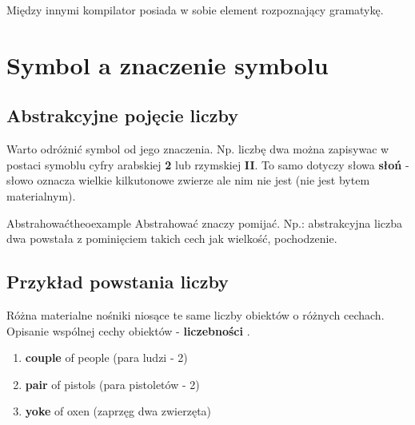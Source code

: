 	Między innymi kompilator posiada w sobie element rozpoznający gramatykę. \newline

\newpage
\section{Symbol a znaczenie symbolu}

	\subsection{Abstrakcyjne pojęcie liczby}
		
		Warto odróżnić symbol od jego znaczenia. Np. liczbę dwa można zapisywac w postaci symoblu 
		cyfry arabskiej { \bf 2} lub rzymskiej  { \bf II}. To samo dotyczy słowa 
		{ \bf słoń } - słowo oznacza wielkie kilkutonowe zwierze ale nim nie jest 
		(nie jest bytem materialnym). \newline

		 \begin{mytheo}{Abstrahować}{theoexample}
		 	Abstrahować znaczy pomijać. \newline
			Np.: abstrakcyjna liczba dwa powstała z pominięciem takich 
			cech jak wielkość, pochodzenie.
		\end{mytheo}

		 
	\subsection{Przykład powstania liczby}
		Różna materialne nośniki niosące te same liczby obiektów o różnych cechach. \newline
		Opisanie wspólnej cechy obiektów - { \bf liczebności} .
		
		\begin{enumerate}[label=(\roman*)]
		  \item {\bf couple} of people (para ludzi - 2)
		  \item {\bf pair} of pistols (para pistoletów - 2)
		  \item {\bf yoke} of oxen (zaprzęg dwa zwierzęta)
		\end{enumerate}
		 
